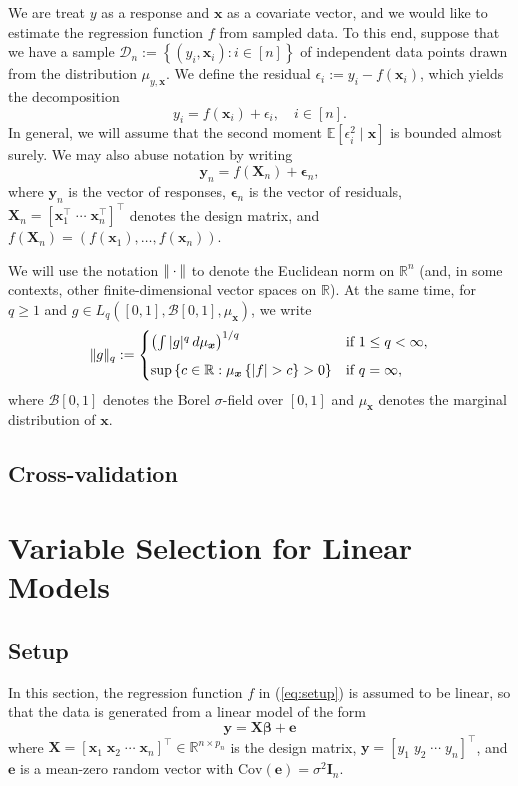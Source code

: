 \documentclass[11pt, letter paper]{article}
\newcommand{\1}{\mathmybb{1}}
\newcommand{\R}{\mathbb{R}}
\newcommand{\0}{\emptyset}
\newcommand{\Ep}[1]{\mathbb{E}\left[ #1 \right]}
\newcommand{\paren}[1]{\left(#1 \right)}
\newcommand{\sqbr}[1]{\left[#1 \right]}
\newcommand{\set}[1]{\left\{ #1 \right\}}
\newcommand{\norm}[1]{|\hspace{-1pt}|#1 |\hspace{-1pt}|}
\newcommand{\data}{\mathcal{D}_{n}}
\newcommand{\X}{\boldsymbol{X}}
\newcommand{\x}{\boldsymbol{x}}
\newcommand{\y}{\boldsymbol{y}}
\newcommand{\e}{\boldsymbol{e}}
\newcommand{\Cov}[1]{\mathrm{Cov}\paren{#1}}
\newcommand{\bbeta}{\boldsymbol{\beta}}
\newcommand{\bepsilon}{\boldsymbol{\epsilon}}
\begin{document}
We are treat \(y\) as a response and \(\x\) as a covariate vector, and we would like to estimate the regression function \(f\) from sampled data. To this end, suppose that we have a sample \(\data := \set{\paren{y_{i}, \x_{i}}:i\in [n]}\) of independent data points drawn from the distribution \(\mu_{y, \x}\). We define the residual \(\epsilon_{i}:= y_{i} - f(\x_{i})\), which yields the decomposition
\[y_{i} = f(\x_{i}) + \epsilon_{i}, \quad i\in[n].\]
In general, we will assume that the second moment \(\Ep{\epsilon^{2}_{i}\mid\x}\) is bounded almost surely. We may also abuse notation by writing
\[\y_{n} = f(\X_{n}) + \bepsilon_{n},\]
where  \(\y_{n}\) is the vector of responses, \(\bepsilon_{n}\) is the vector of residuals, \(\X_{n} = [\x_{1}^{\top}\;\cdots\;\x_{n}^{\top}]^{\top}\) denotes the design matrix, and \(f(\X_{n}) = (f(\x_{1}),\ldots,f(\x_{n}))\).

We will use the notation \(\norm{\cdot}\) to denote the Euclidean norm on \(\R^{n}\) (and, in some contexts, other finite-dimensional vector spaces on \(\R\)). At the same time, for \(q\geq 1\) and \(g\in L_{q}([0,1], \mathcal{B}[0,1], \mu_{\x})\), we write 
\[\norm{g}_{q} := \begin{cases}
    \paren{\int|g|^{q}\,d\mu_{\x}}^{1/q}&\text{if }1\leq q < \infty,\\[2mm]
    \sup\set{c\in\R:\mu_{\x}\set{|f|>c}>0} &\text{if } q = \infty,
\end{cases}\]
where \(\mathcal{B}[0,1]\) denotes the Borel \(\sigma\)-field over \([0,1]\) and \(\mu_{\x}\) denotes the marginal distribution of \(\x\).


\subsection{Cross-validation}



\newpage
\section{Variable Selection for Linear Models}\label{sec:lm}
\subsection{Setup}\label{sec:lmsetup}
In this section, the regression function \(f\) in (\ref{eq:setup}) is assumed to be linear, so that the data is generated from a linear model of the form
\[\y = \X\bbeta + \e\]
where \(\X = {[\x_{1}\;\x_{2}\;\cdots\;\x_{n}]}^{\top}\in\R^{n\times p_{n}}\) is the design matrix, \(\y = \sqbr{y_{1}\; y_{2}\;\cdots\; y_{n}}^{\top}\), and \(\e\) is a mean-zero random vector with \(\Cov{\e} = \sigma^{2}\boldsymbol{I}_{n}\).
\end{document}
